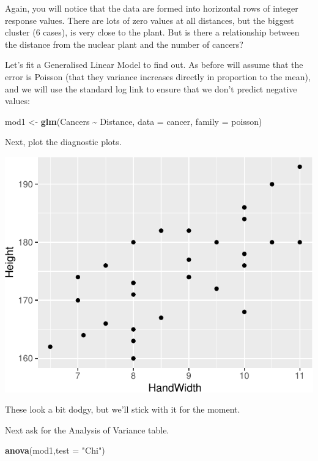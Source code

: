 \documentclass[
  a4paperpaper,
]{book}
\newenvironment{Shaded}{\begin{snugshade}}{\end{snugshade}}
\newcommand{\DataTypeTok}[1]{\textcolor[rgb]{0.13,0.29,0.53}{#1}}
\newcommand{\KeywordTok}[1]{\textcolor[rgb]{0.13,0.29,0.53}{\textbf{#1}}}
\newcommand{\NormalTok}[1]{#1}
\newcommand{\OperatorTok}[1]{\textcolor[rgb]{0.81,0.36,0.00}{\textbf{#1}}}
\newcommand{\StringTok}[1]{\textcolor[rgb]{0.31,0.60,0.02}{#1}}
\begin{document}
Again, you will notice that the data are formed into horizontal rows of integer response values. There are lots of zero values at all distances, but the biggest cluster (6 cases), is very close to the plant. But is there a relationship between the distance from the nuclear plant and the number of cancers?

Let's fit a Generalised Linear Model to find out. As before will assume that the error is Poisson (that they variance increases directly in proportion to the mean), and we will use the standard log link to ensure that we don't predict negative values:

\begin{Shaded}
\begin{Highlighting}[]
\NormalTok{mod1 \textless{}{-}}\StringTok{ }\KeywordTok{glm}\NormalTok{(Cancers }\OperatorTok{\textasciitilde{}}\StringTok{ }\NormalTok{Distance, }\DataTypeTok{data =}\NormalTok{ cancer, }\DataTypeTok{family =}\NormalTok{ poisson)}
\end{Highlighting}
\end{Shaded}

Next, plot the diagnostic plots.

\begin{center}\includegraphics{BB852_files/figure-latex/unnamed-chunk-241-1} \end{center}

These look a bit dodgy, but we'll stick with it for the moment.

Next ask for the Analysis of Variance table.

\begin{Shaded}
\begin{Highlighting}[]
\KeywordTok{anova}\NormalTok{(mod1,}\DataTypeTok{test =} \StringTok{"Chi"}\NormalTok{)}
\end{Highlighting}
\end{Shaded}
\end{document}
